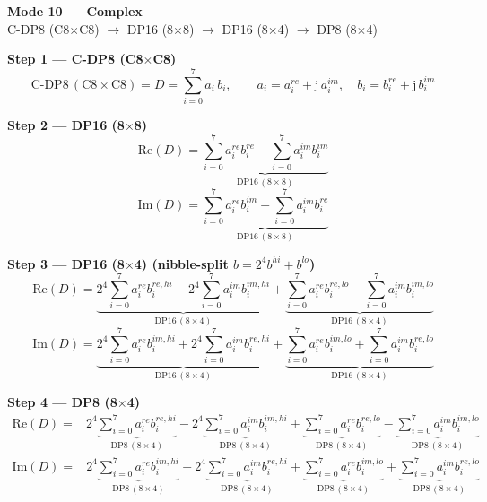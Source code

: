 \documentclass[fleqn]{article}
\newcommand{\DPop}[3]{\mathrm{DP#1}\,(#2\!\times\!#3)}
\begin{document}
\begin{center}
{\LARGE \textbf{Mode 10 --- Complex}}\\[4pt]
{\large C-DP8 (C8$\times$C8) $\rightarrow$ DP16 (8$\times$8) $\rightarrow$ DP16 (8$\times$4) $\rightarrow$ DP8 (8$\times$4)}
\end{center}

\vspace{1.5em}

\noindent\textbf{Step 1 --- C-DP8 (C8$\times$C8)}
\[
\text{C-DP8}\,(\mathrm{C8}\!\times\!\mathrm{C8}) = D = \sum_{i=0}^{7} a_i \, b_i, \qquad
a_i = a_i^{re} + \mathrm{j}\,a_i^{im}, \quad
b_i = b_i^{re} + \mathrm{j}\,b_i^{im}
\]

\vspace{0.3em}

\noindent\textbf{Step 2 --- DP16 (8$\times$8)}
\[
\mathrm{Re}(D) = \underbrace{\sum_{i=0}^{7} a_i^{re} b_i^{re}
  - \sum_{i=0}^{7} a_i^{im} b_i^{im}}_{\DPop{16}{8}{8}}
\]
\[
\mathrm{Im}(D) = \underbrace{\sum_{i=0}^{7} a_i^{re} b_i^{im}
  + \sum_{i=0}^{7} a_i^{im} b_i^{re}}_{\DPop{16}{8}{8}}
\]

\vspace{0.3em}

\noindent\textbf{Step 3 --- DP16 (8$\times$4) \quad (nibble-split $b = 2^{4} b^{hi} + b^{lo}$)}
\[
\mathrm{Re}(D) = \underbrace{2^{4}\sum_{i=0}^{7} a_i^{re} b_i^{re,hi}
  - 2^{4}\sum_{i=0}^{7} a_i^{im} b_i^{im,hi}}_{\DPop{16}{8}{4}}
  + \underbrace{\sum_{i=0}^{7} a_i^{re} b_i^{re,lo}
  - \sum_{i=0}^{7} a_i^{im} b_i^{im,lo}}_{\DPop{16}{8}{4}}
\]
\[
\mathrm{Im}(D) = \underbrace{2^{4}\sum_{i=0}^{7} a_i^{re} b_i^{im,hi}
  + 2^{4}\sum_{i=0}^{7} a_i^{im} b_i^{re,hi}}_{\DPop{16}{8}{4}}
  + \underbrace{\sum_{i=0}^{7} a_i^{re} b_i^{im,lo}
  + \sum_{i=0}^{7} a_i^{im} b_i^{re,lo}}_{\DPop{16}{8}{4}}
\]

\vspace{0.3em}

\noindent\textbf{Step 4 --- DP8 (8$\times$4)}
\begin{align*}
\mathrm{Re}(D) = {}
  & 2^{4} \underbrace{\sum_{i=0}^{7} a_i^{re} b_i^{re,hi}}_{\DPop{8}{8}{4}}
  - 2^{4} \underbrace{\sum_{i=0}^{7} a_i^{im} b_i^{im,hi}}_{\DPop{8}{8}{4}}
  + \underbrace{\sum_{i=0}^{7} a_i^{re} b_i^{re,lo}}_{\DPop{8}{8}{4}}
  - \underbrace{\sum_{i=0}^{7} a_i^{im} b_i^{im,lo}}_{\DPop{8}{8}{4}}
\end{align*}
\begin{align*}
\mathrm{Im}(D) = {}
  & 2^{4} \underbrace{\sum_{i=0}^{7} a_i^{re} b_i^{im,hi}}_{\DPop{8}{8}{4}}
  + 2^{4} \underbrace{\sum_{i=0}^{7} a_i^{im} b_i^{re,hi}}_{\DPop{8}{8}{4}}
  + \underbrace{\sum_{i=0}^{7} a_i^{re} b_i^{im,lo}}_{\DPop{8}{8}{4}}
  + \underbrace{\sum_{i=0}^{7} a_i^{im} b_i^{re,lo}}_{\DPop{8}{8}{4}}
\end{align*}
\end{document}
